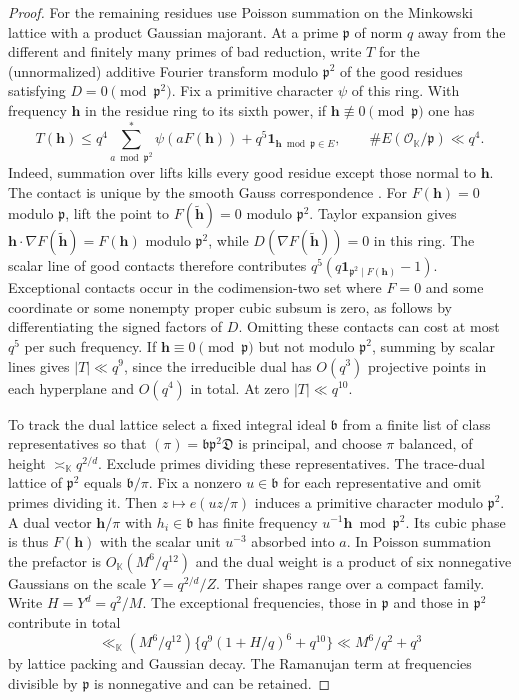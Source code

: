 \documentclass[11pt,letterpaper]{article}
\theoremstyle{definition}
\numberwithin{equation}{section}
\begin{document}
\begin{proof}
For the remaining residues use Poisson summation on the Minkowski lattice
with a product Gaussian majorant. At a prime $\mathfrak p$ of norm $q$ away
from the different and finitely many primes of bad reduction, write $T$
for the (unnormalized) additive Fourier transform modulo $\mathfrak p^2$
of the good residues satisfying $D=0\pmod{\mathfrak p^2}$.
Fix a primitive character $\psi$ of this ring. With frequency $\mathbf h$
in the residue ring to its sixth power, if
$\mathbf h\not\equiv0\pmod{\mathfrak p}$ one has
\[
 T(\mathbf h)\le q^4
       \sum_{a\bmod\mathfrak p^2}^{*}\psi(aF(\mathbf h))
        +q^5\mathbf1_{\mathbf h\bmod\mathfrak p\in E},
 \qquad \#E(\mathcal O_{\mathbb K}/\mathfrak p)\ll q^4.
\]
Indeed, summation over lifts kills every good residue except those normal
to $\mathbf h$. The contact is unique by the smooth Gauss correspondence
\cite[Proposition 9.11, proof]{c3:wang}. For $F(\mathbf h)=0$ modulo
$\mathfrak p$, lift the point to $F(\tilde{\mathbf h})=0$ modulo
$\mathfrak p^2$. Taylor expansion gives
$\mathbf h\cdot\nabla F(\tilde{\mathbf h})=F(\mathbf h)$ modulo
$\mathfrak p^2$, while $D(\nabla F(\tilde{\mathbf h}))=0$ in this ring.
The scalar line of good contacts therefore contributes
$q^5(q\mathbf1_{\mathfrak p^2\mid F(\mathbf h)}-1)$.
Exceptional contacts occur in the codimension-two set where $F=0$ and
some coordinate or some nonempty proper cubic subsum is zero, as follows
by differentiating the signed factors of $D$. Omitting these contacts can
cost at most $q^5$ per such frequency. If $\mathbf h\equiv0\pmod{\mathfrak p}$
but not modulo $\mathfrak p^2$, summing by scalar lines gives
$|T|\ll q^9$, since the irreducible dual has $O(q^3)$ projective points
in each hyperplane and $O(q^4)$ in total. At zero $|T|\ll q^{10}$.

To track the dual lattice select a fixed integral ideal $\mathfrak b$
from a finite list of class representatives so that
$(\pi)=\mathfrak b\mathfrak p^2\mathfrak D$ is principal, and choose $\pi$
balanced, of height $\asymp_{\mathbb K}q^{2/d}$. Exclude primes dividing
these representatives. The trace-dual lattice of $\mathfrak p^2$ equals
$\mathfrak b/\pi$. Fix a nonzero $u\in\mathfrak b$ for each representative
and omit primes dividing it. Then $z\mapsto e(uz/\pi)$ induces a
primitive character modulo $\mathfrak p^2$. A dual vector
$\mathbf h/\pi$ with $h_i\in\mathfrak b$ has finite frequency
$u^{-1}\mathbf h\bmod\mathfrak p^2$. Its cubic phase is thus
$F(\mathbf h)$ with the scalar unit $u^{-3}$ absorbed into $a$.
In Poisson summation the prefactor is $O_{\mathbb K}(M^6/q^{12})$ and the
dual weight is a product of six nonnegative Gaussians on the scale
$Y=q^{2/d}/Z$. Their shapes range over a compact family.
Write $H=Y^d=q^2/M$. The exceptional frequencies, those in
$\mathfrak p$ and those in $\mathfrak p^2$ contribute in total
\[
 \ll_{\mathbb K}(M^6/q^{12})
           \{q^9(1+H/q)^6+q^{10}\}\ll M^6/q^2+q^3
\]
by lattice packing and Gaussian decay. The Ramanujan term at frequencies
divisible by $\mathfrak p$ is nonnegative and can be retained.


\end{proof}
\end{document}
